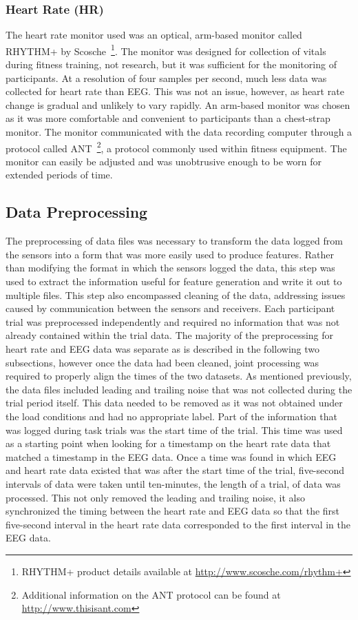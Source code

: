 \documentclass[11pt]{article}
\begin{document}
		\subsubsection{Heart Rate (HR)}
		The heart rate monitor used was an optical, arm-based monitor called RHYTHM+ by Scosche~\footnote{RHYTHM+ product details available at \url{http://www.scosche.com/rhythm+}}. The monitor was designed for collection of vitals during fitness training, not research, but it was sufficient for the monitoring of participants. At a resolution of four samples per second, much less data was collected for heart rate than EEG. This was not an issue, however, as heart rate change is gradual and unlikely to vary rapidly. An arm-based monitor was chosen as it was more comfortable and convenient to participants than a chest-strap monitor. The monitor communicated with the data recording computer through a protocol called ANT~\footnote{Additional information on the ANT protocol can be found at \url{http://www.thisisant.com}}, a protocol commonly used within fitness equipment.  The monitor can easily be adjusted and was unobtrusive enough to be worn for extended periods of time.
		
	\subsection{Data Preprocessing}
	The preprocessing of data files was necessary to transform the data logged from the sensors into a form that was more easily used to produce features. Rather than modifying the format in which the sensors logged the data, this step was used to extract the information useful for feature generation and write it out to multiple files. This step also encompassed cleaning of the data, addressing issues caused by communication between the sensors and receivers. Each participant trial was preprocessed independently and required no information that was not already contained within the trial data. The majority of the preprocessing for heart rate and EEG data was separate as is described in the following two subsections, however once the data had been cleaned, joint processing was required to properly align the times of the two datasets. As mentioned previously, the data files included leading and trailing noise that was not collected during the trial period itself. This data needed to be removed as it was not obtained under the load conditions and had no appropriate label. Part of the information that was logged during task trials was the start time of the trial. This time was used as a starting point when looking for a timestamp on the heart rate data that matched a timestamp in the EEG data. Once a time was found in which EEG and heart rate data existed that was after the start time of the trial, five-second intervals of data were taken until ten-minutes, the length of a trial, of data was processed. This not only removed the leading and trailing noise, it also synchronized the timing between the heart rate and EEG data so that the first five-second interval in the heart rate data corresponded to the first interval in the EEG data.
	
\end{document}
